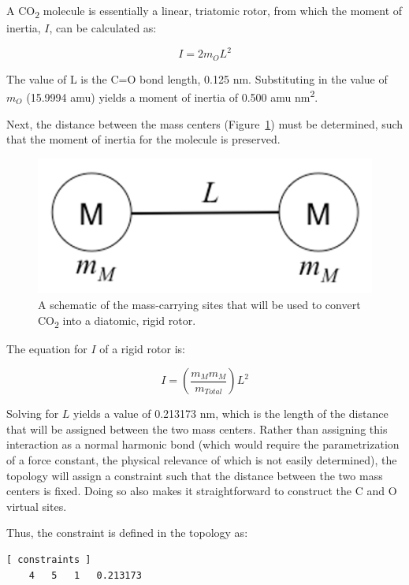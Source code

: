 \documentclass[9pt,tutorial,pubversion]{livecoms}
\begin{document}
A CO\textsubscript{2} molecule is essentially a linear, triatomic rotor, from which the moment of inertia, $I$, can be calculated as:

\begin{equation} \label{eq_rotor}
I = 2 m_O L^2
\end{equation}

The value of L is the C=O bond length, 0.125 nm. Substituting in the value of $m_O$ (15.9994 amu) yields a moment of inertia of 0.500 amu nm\textsuperscript{2}.

Next, the distance between the mass centers (Figure~\ref{vsites_masses_fig}) must be determined, such that the moment of inertia for the molecule is preserved.

\begin{figure}[H]
\centering
\includegraphics{vsites_masses}
\caption{A schematic of the mass-carrying sites that will be used to convert CO\textsubscript{2} into a diatomic, rigid rotor.}
\label{vsites_masses_fig}
\end{figure}

The equation for $I$ of a rigid rotor is:

\begin{equation} \label{eq_diatomic}
I = \left(\frac{m_M m_M}{m_{Total}}\right) L^2
\end{equation}

Solving for $L$ yields a value of 0.213173 nm, which is the length of the distance that will be assigned between the two mass centers. Rather than assigning this interaction as a normal harmonic bond (which would require the parametrization of a force constant, the physical relevance of which is not easily determined), the topology will assign a constraint such that the distance between the two mass centers is fixed. Doing so also makes it straightforward to construct the C and O virtual sites.

Thus, the constraint is defined in the topology as:

\begin{lstlisting}
[ constraints ]
    4   5   1   0.213173
\end{lstlisting}
\end{document}
